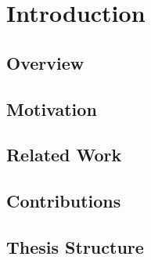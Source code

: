 \chapter{Introduction} \label{chap:intro}
\section{Overview} \label{sec:intro-overview}

\section{Motivation} \label{sec:intro-motivation}

\section{Related Work} \label{sec:intro-relatedW}

\section{Contributions} \label{sec:intro-contr}

\section{Thesis Structure} \label{sec:intro-thesisStruct}